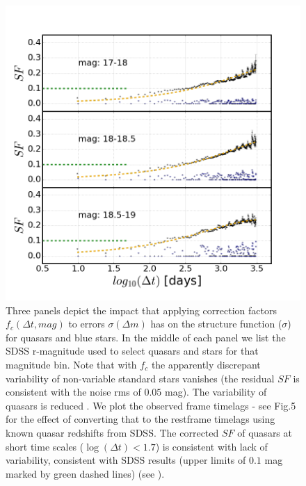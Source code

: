 \documentclass[fleqn,usenatbib]{mnras}  %
\begin{document}
\begin{figure}
\label{fig:4}
 \includegraphics[width=\columnwidth]{Fig_4_SF_QSO_starsB_r_cut.png}
 \caption{Three panels depict the impact that applying correction factors $f_{c}(\Delta t, mag)$ to errors $\sigma(\Delta m)$ has on the structure function ($\sigma$) for quasars and blue stars. In the middle of each panel we list the SDSS r-magnitude used to select quasars and stars for that magnitude bin. Note that with $f_{c}$ the apparently discrepant variability of non-variable standard stars  vanishes (the residual $SF$ is consistent with the noise rms of $0.05$ mag). The variability of quasars is reduced . We plot the observed frame timelags - see Fig.5 for the effect of converting that to the restframe timelags using known quasar redshifts from SDSS. The corrected $SF$ of quasars at short time scales ($\log(\Delta t) < 1.7$) is consistent with lack of variability, consistent with SDSS results (upper limits of $0.1$ mag marked by green dashed lines) (see \citep{macleod2011}).}
\end{figure}
\end{document}
